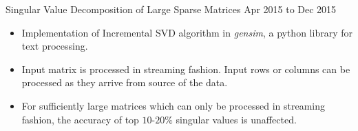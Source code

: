 \documentclass[10pt]{article}
\newenvironment{innerlist}[1][\enskip\textbullet]%
        {\begin{itemize}[#1,leftmargin=*,parsep=0pt,itemsep=0pt,topsep=0pt,partopsep=0pt]}
        {\end{itemize}}
\newcommand{\halfblankline}{\quad\vspace{-0.5\baselineskip}\pagebreak[3]}
\begin{document}
\halfblankline
\vspace{0.1275in}

Singular Value Decomposition of Large Sparse Matrices \hfill{Apr 2015 to Dec 2015}
\vspace{0.1in}
\begin{innerlist}
	\item Implementation of Incremental SVD algorithm in \emph{gensim}, a python library for text processing.
	\item Input matrix is processed in streaming fashion. Input rows or columns can be processed as they arrive from source of the data. 
	\item For sufficiently large matrices which can only be processed in streaming fashion, the accuracy of top $10$-$20\%$ singular values is unaffected.
\end{innerlist}

\halfblankline
\vspace{0.1275in}
\end{document}
